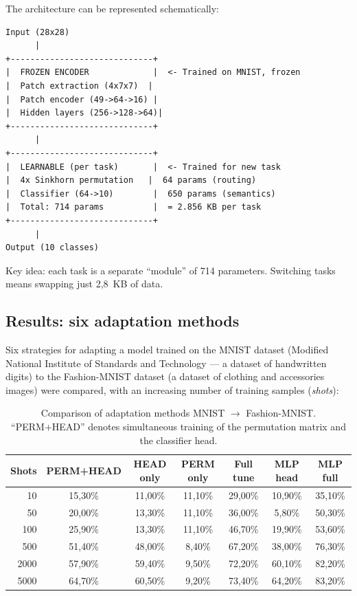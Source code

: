 \documentclass[11pt,a4paper]{report}
\begin{document}
The architecture can be represented schematically:

\begin{verbatim}
Input (28x28)
      |
+-----------------------------+
|  FROZEN ENCODER             |  <- Trained on MNIST, frozen
|  Patch extraction (4x7x7)  |
|  Patch encoder (49->64->16) |
|  Hidden layers (256->128->64)|
+-----------------------------+
      |
+-----------------------------+
|  LEARNABLE (per task)       |  <- Trained for new task
|  4x Sinkhorn permutation   |  64 params (routing)
|  Classifier (64->10)        |  650 params (semantics)
|  Total: 714 params          |  = 2.856 KB per task
+-----------------------------+
      |
Output (10 classes)
\end{verbatim}

Key idea: each task is a separate ``module'' of 714 parameters. Switching tasks means swapping just 2{,}8~KB of data.

\subsection{Results: six adaptation methods}

Six strategies for adapting a model trained on the MNIST dataset (Modified National Institute of Standards and Technology --- a dataset of handwritten digits) to the Fashion-MNIST dataset (a dataset of clothing and accessories images) were compared, with an increasing number of training samples (\emph{shots}):

\begin{table}[htbp]
\centering
\caption{Comparison of adaptation methods MNIST $\to$ Fashion-MNIST. ``PERM+HEAD'' denotes simultaneous training of the permutation matrix and the classifier head.}
\label{tab:perm_head_fewshot}
\begin{tabular}{r|c|c|c|c|c|c}
\hline
\textbf{Shots} & \textbf{PERM+HEAD} & \textbf{HEAD only} & \textbf{PERM only} & \textbf{Full tune} & \textbf{MLP head} & \textbf{MLP full} \\
\hline
10   & 15{,}30\% & 11{,}00\% & 11{,}10\% & 29{,}00\% & 10{,}90\% & 35{,}10\% \\
50   & 20{,}00\% & 13{,}30\% & 11{,}10\% & 36{,}00\% &  5{,}80\% & 50{,}30\% \\
100  & 25{,}90\% & 13{,}30\% & 11{,}10\% & 46{,}70\% & 19{,}90\% & 53{,}60\% \\
500  & 51{,}40\% & 48{,}00\% &  8{,}40\% & 67{,}20\% & 38{,}00\% & 76{,}30\% \\
2000 & 57{,}90\% & 59{,}40\% &  9{,}50\% & 72{,}20\% & 60{,}10\% & 82{,}20\% \\
5000 & 64{,}70\% & 60{,}50\% &  9{,}20\% & 73{,}40\% & 64{,}20\% & 83{,}20\% \\
\hline
\end{tabular}
\end{table}
\end{document}
